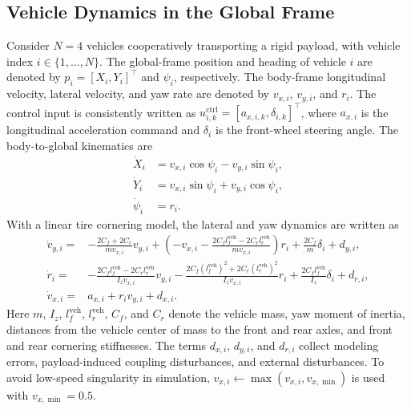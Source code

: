 \documentclass[twocolumn,3p,times,procedia]{elsarticle}
\begin{document}
\subsection{Vehicle Dynamics in the Global Frame}

Consider $N=4$ vehicles cooperatively transporting a rigid payload, with vehicle index $i\in\{1,\ldots,N\}$. The global-frame position and heading of vehicle $i$ are denoted by
$p_i=[X_i,Y_i]^\top$ and $\psi_i$, respectively. The body-frame longitudinal velocity, lateral velocity, and yaw rate are denoted by $v_{x,i}$, $v_{y,i}$, and $r_i$. The control input is consistently written as $u_{i,k}^{\mathrm{ctrl}}=[a_{x,i,k},\delta_{i,k}]^\top$, where $a_{x,i}$ is the longitudinal acceleration command and $\delta_i$ is the front-wheel steering angle. The body-to-global kinematics are
\begin{equation}
\begin{aligned}
\dot X_i &= v_{x,i}\cos\psi_i-v_{y,i}\sin\psi_i,\\
\dot Y_i &= v_{x,i}\sin\psi_i+v_{y,i}\cos\psi_i,\\
\dot \psi_i &= r_i .
\end{aligned}
\label{eq:world_kinematics}
\end{equation}
With a linear tire cornering model, the lateral and yaw dynamics are written as
\begin{equation}
\begin{aligned}
\dot v_{y,i}=&-\frac{2C_f+2C_r}{m v_{x,i}}v_{y,i}+
\left(-v_{x,i}-\frac{2C_f l_f^{\mathrm{veh}}-2C_r l_r^{\mathrm{veh}}}{m v_{x,i}}\right)r_i
+\frac{2C_f}{m}\delta_i+d_{y,i},\\
\dot r_i=&-\frac{2C_f l_f^{\mathrm{veh}}-2C_r l_r^{\mathrm{veh}}}{I_z v_{x,i}}v_{y,i}
-\frac{2C_f (l_f^{\mathrm{veh}})^2+2C_r (l_r^{\mathrm{veh}})^2}{I_z v_{x,i}}r_i
+\frac{2C_f l_f^{\mathrm{veh}}}{I_z}\delta_i+d_{r,i},\\
\dot v_{x,i}=&a_{x,i}+r_i v_{y,i}+d_{x,i}.
\end{aligned}
\label{eq:bicycle_dynamics}
\end{equation}
Here $m$, $I_z$, $l_f^{\mathrm{veh}}$, $l_r^{\mathrm{veh}}$, $C_f$, and $C_r$ denote the vehicle mass, yaw moment of inertia, distances from the vehicle center of mass to the front and rear axles, and front and rear cornering stiffnesses. The terms $d_{x,i}$, $d_{y,i}$, and $d_{r,i}$ collect modeling errors, payload-induced coupling disturbances, and external disturbances. To avoid low-speed singularity in simulation, $v_{x,i}\leftarrow\max(v_{x,i},v_{x,\min})$ is used with $v_{x,\min}=0.5$.
\end{document}
